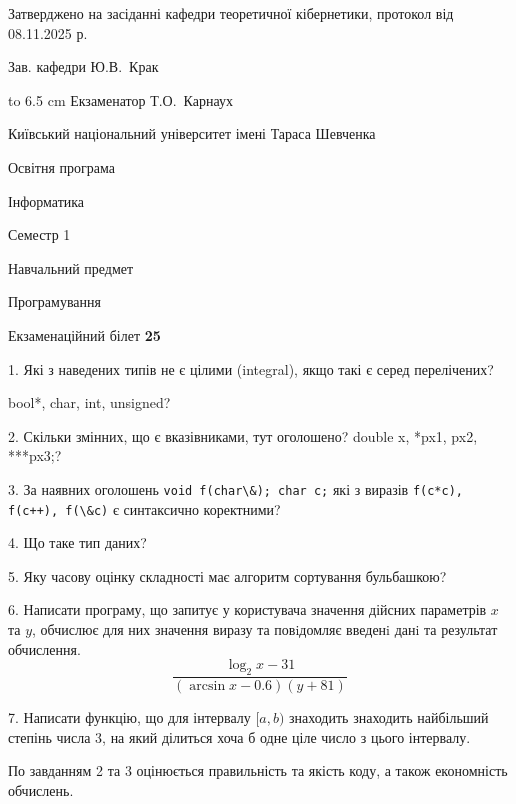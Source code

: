 \documentclass[12pt, ukrainian]{article}
\def\code#1{\Verb!#1!}
\begin{document}
{\smallskip\smallskip \begin {scriptsize} Затверджено на засіданні кафедри теоретичної кібернетики, протокол   від   08.11.2025 р.\par\smallskip\smallskip\smallskip\smallskip
{\parbox {6.5 cm} {Зав. кафедри \dotfill Ю.В.~Крак}}\hspace {0.7cm} {\hbox to 6.5 cm { Екзаменатор \dotfill Т.О.~Карнаух}} \end{scriptsize}}
\newpage
{{\begin {scriptsize}\par
{ \center  Київський національний університет імені Тараса Шевченка \par}
{\parbox {5 cm}{Освітня програма \hfill}{\parbox {7 cm}{Інформатика\hfill}}\parbox {6 cm}{\hfill Семестр 1}}\par
{\parbox {5 cm} {Навчальний предмет \hfill}\parbox {7 cm}{Програмування \hfill}\parbox {6cm}{\hfill}\par}\vspace{-15pt} \end{scriptsize}}{\center Екзаменаційний білет \No \textbf { 25 }\par}}
{%
1. Які з наведених типів не є цілими (integral), якщо такі є серед перелічених?

bool*, char, int, unsigned?
\par
\vspace{2mm}
2. Скільки змінних, що є вказівниками, тут оголошено?
double x, *px1, px2, ***px3;?
\par
\vspace{2mm}
3. За наявних оголошень \code{void f(char\&); char c;} які з виразів \code{f(c*c), f(c++), f(\&c)} є синтаксично коректними?
\par
\vspace{2mm}
4. Що таке тип даних?
\par
\vspace{2mm}
5. Яку часову оцінку складності має алгоритм сортування бульбашкою?
\par
\vspace{2mm}
6. Написати програму, що запитує у користувача значення дійсних параметрів $x$ та $y$, обчислює для них значення виразу та повiдомляє введенi данi та результат обчислення.
$$\frac{\log_{2} x - 31}{(\arcsin x - 0.6) (y + 81)}$$ 

\par
7. Написати функцію, що для інтервалу $[a, b)$ знаходить знаходить найбільший степінь числа 3, на який ділиться хоча б одне ціле число з цього інтервалу.

По завданням 2 та 3 оцінюється правильність та якість коду, а також економність обчислень.

}
\end{document}
